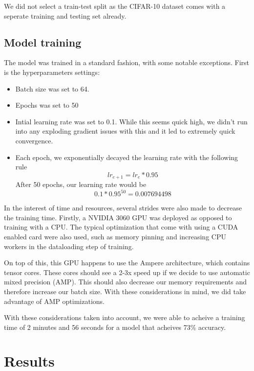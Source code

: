 \documentclass[letterpaper, 12pt]{article}
\begin{document}
We did not select a train-test split as the CIFAR-10 dataset comes with a seperate training and testing set already.

\subsection{Model training}
The model was trained in a standard fashion, with some notable exceptions. First is the hyperparameters settings:

\begin{itemize}
\item Batch size was set to 64.
\item Epochs was set to 50
\item Intial learning rate was set to 0.1. While this seems quick high, we didn't run into any exploding gradient issues with this and it led to extremely quick convergence.
\item Each epoch, we exponentially decayed the learning rate with the following rule \[lr_{e+1} = lr_{e} * 0.95\]
After 50 epochs, our learning rate would be \[0.1 * 0.95^{50} = 0.007694498\]
\end{itemize}

In the interest of time and resources, several strides were also made to decrease the training time. Firstly, a NVIDIA 3060 GPU was deployed as opposed to training with a CPU. The typical optimization that come with using a CUDA enabled card were also used, such as memory pinning and increasing CPU workers in the dataloading step of training.

On top of this, this GPU happens to use the Ampere architecture, which contains tensor cores. These cores should see a 2-3x speed up if we decide to use automatic mixed precision (AMP). This should also decrease our memory requirements and therefore increase our batch size. With these considerations in mind, we did take advantage of AMP optimizations.

With these considerations taken into account, we were able to acheive a training time of 2 minutes and 56 seconds for a model that acheives 73\% accuracy.


\section{Results}
\end{document}
